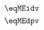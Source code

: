 \begin{equation} \label{eq:nExampleAligned}
	\begin{aligned}
		\eqMEidv \\
		\eqMEdpv
	\end{aligned}
\end{equation}